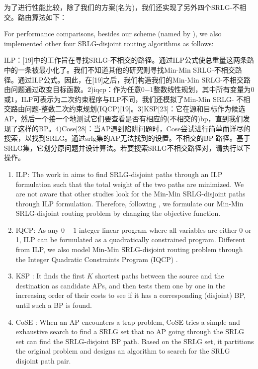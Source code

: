 为了进行性能比较，除了我们的方案(名为)，我们还实现了另外四个SRLG-不相交。路由算法如下：

For performance comparisons, besides our scheme (named by \CI), we also implemented other four SRLG-disjoint routing algorithms as follows:

ILP：[19]中的工作旨在寻找SRLG-不相交的路径。通过ILP公式使总重量这两条路中的一条被最小化了。我们不知道其他的研究则寻找Min-Min SRLG-不相交路径。通过ILP公式。因此，在[19]之后，我们构造我们的Min-Min SRLG-不相交路由问题通过改变目标函数。2)iqcp：作为任意0−1整数线性规划，其中所有变量为0或1，ILP可表示为二次约束程序与ILP不同，我们还模拟了Min-Min SRLG- 不相交路由问题-整数二次约束规划(IQCP)[19]。3)KSP[23]：它在源和目标作为候选AP，然后一个接一个地测试它们要查看是否有相应的(不相交的)bp，直到我们发现了这样的BP。4)Cose[28]：当AP遇到陷阱问题时，Cose尝试进行简单而详尽的搜索，以找到SRLG。通过srlg集的AP无法找到的设置。不相交的BP 路径。基于SRLG集，它划分原问题并设计算法。若要搜索SRLG不相交路径对，请执行以下操作。

\begin{enumerate}
  \item ILP: The work in \cite{hu2003diverse}  aims to find SRLG-disjoint paths through an ILP formulation such that the total weight of the two paths are minimized. We are not aware that other studies look for the Min-Min SRLG-disjoint paths through ILP formulation. Therefore, following \cite{hu2003diverse}, we formulate  our Min-Min SRLG-disjoint routing problem by changing the objective function.
  \item IQCP: As any $0-1$ integer linear program where all variables are either 0 or 1,  ILP can be formulated as a quadratically constrained program. Different from ILP, we also model Min-Min SRLG-disjoint routing problem through the Integer Quadratic Constraints Program (IQCP) \cite{hu2003diverse}.
  \item KSP \cite{eppstein1998finding}: It finds the first $K$ shortest paths between the source and the destination as candidate APs, and then tests them one by one in the increasing order of their costs to see if it has a corresponding (disjoint) BP, until such a BP is found.
  \item CoSE \cite{rostami2007cose}: When an AP encounters a trap problem, CoSE tries a simple and exhaustive search to find a SRLG set that no AP going through the SRLG set can find the SRLG-disjoint BP path. Based on the SRLG set, it partitions the original problem  and designs an algorithm to search for the SRLG disjoint path pair.
\end{enumerate}

